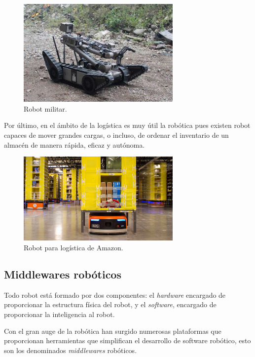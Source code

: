 \documentclass[a4paper, 12pt]{book}
\begin{document}
\begin{figure}[H]
	\centering
    \includegraphics[width=8cm]{img/robot_militar}
    \caption{Robot militar.}
    \label{figura:coche_autonomo}
\end{figure}

Por último, en el ámbito de la logística es muy útil la robótica pues existen robot capaces de mover grandes cargas, o incluso, de ordenar el inventario de un almacén de manera rápida, eficaz y autónoma.

\begin{figure}[H]
	\centering
    \includegraphics[width=8cm]{img/Robot-Kiva-de-Amazon.jpg}
    \caption{Robot para logística de Amazon.}
    \label{figura:coche_autonomo}
\end{figure}

\subsection{Middlewares robóticos}
\label{subsec:middlewares}

Todo robot está formado por dos componentes: el \textit{hardware} encargado de proporcionar la estructura física del robot, y el \textit{software}, encargado de proporcionar la inteligencia al robot.

Con el gran auge de la robótica han surgido numerosas plataformas que proporcionan herramientas que simplifican el desarrollo de software robótico, esto son los denominados \textit{middlewares} robóticos.

\end{document}

